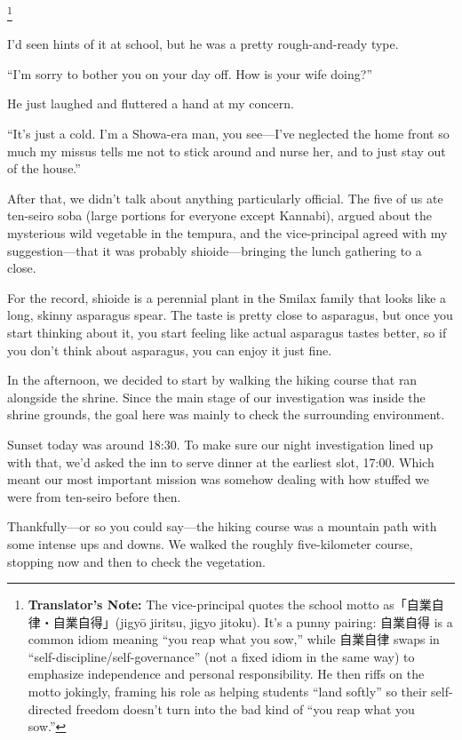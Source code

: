 \documentclass[
    a4paper,
    12pt,
    twoside,
    openany,
    UTF8,
    fontset=windows
]{ctexbook}
\begin{document}
\footnote{\textbf{Translator's Note:} The vice-principal quotes the school motto as「自業自律・自業自得」(jigy\=o jiritsu, jigyo jitoku). It's a punny pairing: 自業自得 is a common idiom meaning ``you reap what you sow,'' while 自業自律 swaps in ``self-discipline/self-governance'' (not a fixed idiom in the same way) to emphasize independence and personal responsibility. He then riffs on the motto jokingly, framing his role as helping students ``land softly'' so their self-directed freedom doesn't turn into the bad kind of ``you reap what you sow.''}

I'd seen hints of it at school, but he was a pretty rough-and-ready type.

``I'm sorry to bother you on your day off. How is your wife doing?''

He just laughed and fluttered a hand at my concern.

``It's just a cold. I'm a Showa-era man, you see---I've neglected the home front so much my missus tells me not to stick around and nurse her, and to just stay out of the house.''

After that, we didn't talk about anything particularly official. The five of us ate ten-seiro soba (large portions for everyone except Kannabi), argued about the mysterious wild vegetable in the tempura, and the vice-principal agreed with my suggestion---that it was probably shioide---bringing the lunch gathering to a close.

For the record, shioide is a perennial plant in the Smilax family that looks like a long, skinny asparagus spear. The taste is pretty close to asparagus, but once you start thinking about it, you start feeling like actual asparagus tastes better, so if you don't think about asparagus, you can enjoy it just fine.

In the afternoon, we decided to start by walking the hiking course that ran alongside the shrine. Since the main stage of our investigation was inside the shrine grounds, the goal here was mainly to check the surrounding environment.

Sunset today was around 18:30. To make sure our night investigation lined up with that, we'd asked the inn to serve dinner at the earliest slot, 17:00. Which meant our most important mission was somehow dealing with how stuffed we were from ten-seiro before then.

Thankfully---or so you could say---the hiking course was a mountain path with some intense ups and downs. We walked the roughly five-kilometer course, stopping now and then to check the vegetation.
\end{document}

